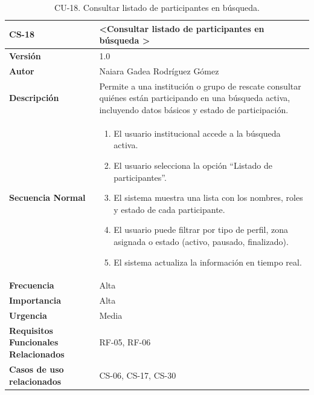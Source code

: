 \begin{table}[htbp] %
\centering
\begin{tabular}{ |m{3cm}|m{11cm}|  } 
\hline
\cellcolor[HTML]{B9E3F0}\centering\textbf{CS-18} & \cellcolor[HTML]{B9E3F0}\textbf{\textless Consultar listado de participantes en búsqueda \textgreater}\\

\hline
\cellcolor[HTML]{EFEFEF}\textbf{Versión}             & 1.0  \\
\hline
\cellcolor[HTML]{EFEFEF}\textbf{Autor}                & Naiara Gadea Rodríguez Gómez\\
\hline
\cellcolor[HTML]{EFEFEF}\textbf{Descripción}                & {Permite a una institución o grupo de rescate consultar quiénes están participando en una búsqueda activa, incluyendo datos básicos y estado de participación.}\\
\hline
\cellcolor[HTML]{EFEFEF}\textbf{Secuencia \newline Normal}                &                 
        \begin{enumerate}
			\item El usuario institucional accede a la búsqueda activa.
			\item El usuario selecciona la opción “Listado de participantes”.
			\item El sistema muestra una lista con los nombres, roles y estado de cada participante.
			\item El usuario puede filtrar por tipo de perfil, zona asignada o estado (activo, pausado, finalizado).
			\item El sistema actualiza la información en tiempo real.
		\end{enumerate}\\
\hline
\cellcolor[HTML]{EFEFEF}\textbf{Frecuencia}                & Alta\\
\hline
\cellcolor[HTML]{EFEFEF}\textbf{Importancia}                & Alta\\
\hline
\cellcolor[HTML]{EFEFEF}\textbf{Urgencia}                & Media\\
\hline
\cellcolor[HTML]{EFEFEF}\textbf{Requisitos Funcionales Relacionados}                & {RF-05, RF-06}\\
\hline
\cellcolor[HTML]{EFEFEF}\textbf{Casos de uso relacionados}                & {CS-06, CS-17, CS-30}\\
\hline
\end{tabular}
\caption{CU-18. Consultar listado de participantes en búsqueda.}
\end{table}

